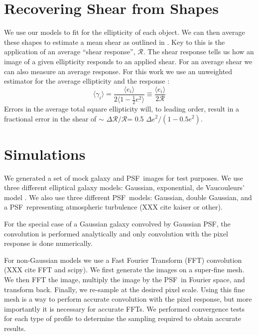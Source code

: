 \documentclass[10pt,preprint]{aastex}
\newcommand{\psf}{PSF}
\newcommand{\Rshear}{\ensuremath{\mathcal{R}}}
\newcommand{\rfracerr}{\ensuremath{\Delta \Rshear/\Rshear}}
\begin{document}
\section{Recovering Shear from Shapes}

We use our models to fit for the ellipticity of each object.  We can then
average these shapes to estimate a mean shear as outlined in \citet{bern02}.
Key to this is the application of an average ``shear response'', \Rshear.  The
shear response tells us how an image of a given ellipticity responds to an
applied shear.  For an average shear we can also measure an average response.
For this work we use an unweighted estimator for the average ellipticity and
the response \citep[see e.g.  Equation 5.11,][]{bern02}:
\begin{equation} \label{eq:shearest}
\langle \gamma_i \rangle  = \frac{\langle e_i \rangle}{2 \langle 1 - \frac{1}{2} e^2 \rangle } \equiv
  \frac{\langle e_i \rangle}{2 \Rshear} 
\end{equation}
\noindent Errors in the average total square ellipticity will, to leading
order, result in a fractional error in the shear of $\sim$ \rfracerr = 
0.5 $\Delta e^2/(1-0.5 e^2)$.

\section{Simulations} \label{sec:sim}

We generated a set of mock galaxy and \psf\ images for test purposes.  We use
three different elliptical galaxy models: Gaussian, exponential, de
Vaucouleurs' model \citep{devauc1948}.  We also use three different \psf\ models:
Gaussian, double Gaussian, and a \psf\ representing atmospheric turbulence (XXX
cite kaiser or other).

For the special case of a Gaussian galaxy convolved by Gaussian \psf, the
convolution is performed analytically and only convolution with the pixel
response is done numerically.  

For non-Gaussian models we use a Fast Fourier Transform (FFT) convolution (XXX
cite FFT and scipy).  We first generate the images on a super-fine mesh. We
then FFT the image, multiply the image by the \psf\ in Fourier space, and
transform back. Finally, we re-sample at the desired pixel scale.  Using this
fine mesh is a way to perform accurate convolution with the pixel response, but
more importantly it is necessary for accurate FFTs.  We performed convergence
tests for each type of profile to determine the sampling required to obtain
accurate results.
\end{document}
